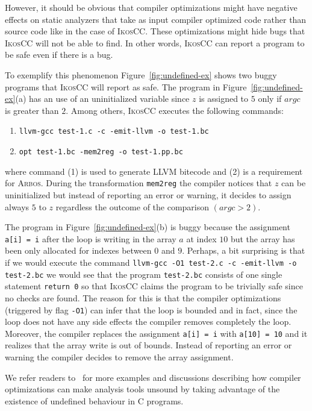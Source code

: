 \documentclass[a4]{article}
\newcommand{\arbos}{\textsc{Arbos}\xspace}
\newcommand{\ikoscc}{\textsc{IkosCC}\xspace}
\begin{document}
However, it should be obvious that compiler optimizations might have
negative effects on static analyzers that take as input compiler
optimized code rather than source code like in the case of
\ikoscc. These optimizations might hide bugs that \ikoscc will not be
able to find. In other words, \ikoscc can report a program to be safe
even if there is a bug.

To exemplify this phenomenon Figure~\ref{fig:undefined-ex} shows two
buggy programs that \ikoscc will report as safe.
%
The program in Figure~\ref{fig:undefined-ex}(a) has an use of an
uninitialized variable since $z$ is assigned to $5$ only if $argc$
is greater than $2$. Among others, \ikoscc executes the following
commands:
%
\begin{enumerate} 
\item \texttt{llvm-gcc test-1.c -c -emit-llvm -o test-1.bc} 
\item \texttt{opt test-1.bc -mem2reg -o test-1.pp.bc} 
\end{enumerate}
%
\noindent where command (1) is used to generate LLVM bitecode and (2)
is a requirement for \arbos. During the transformation
\texttt{mem2reg} the compiler notices that $z$ can be uninitialized
but instead of reporting an error or warning, it decides to
assign always $5$ to $z$ regardless the outcome of the comparison
$(argc > 2)$.

The program in Figure~\ref{fig:undefined-ex}(b) is buggy because the
assignment \texttt{a[i] = i} after the loop is writing in the array
$a$ at index $10$ but the array has been only allocated for indexes
between $0$ and $9$.
%
Perhaps, a bit surprising is that if we would execute the command
\texttt{llvm-gcc -O1 test-2.c -c -emit-llvm -o test-2.bc} we would see
that the program \texttt{test-2.bc} consists of one single statement
\texttt{return 0} so that \ikoscc claims the program to be trivially
safe since no checks are found. The reason for this is that the
compiler optimizations (triggered by flag \texttt{-O1}) can infer that
the loop is bounded and in fact, since the loop does not have any side
effects the compiler removes completely the loop. Moreover, the
compiler replaces the assignment \texttt{a[i] = i} with \texttt{a[10]
  = 10} and it realizes that the array write is out of bounds. Instead
of reporting an error or warning the compiler decides to remove the
array assignment.

We refer readers to~\cite{regehr-undefined,llvm-undefined} for more
examples and discussions describing how compiler optimizations can
make analysis tools unsound by taking advantage of the existence of
undefined behaviour in C programs.
\end{document}
